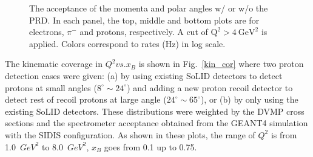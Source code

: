 \begin{figure}[!ht]
 \begin{center}
   \caption[The acceptance of the momenta and scattering angles for electrons, $\pi^{-}$ and protons]{\footnotesize{The acceptance of the momenta and polar angles w/ or w/o the PRD. In each panel, the top, middle and bottom plots are for electrons, $\pi^{-}$ and protons, respectively. A cut of $\mathrm{Q^{2}>4~GeV^{2}}$ is applied. Colors correspond to rates (Hz) in log scale.}}
  \label{p_theta}
  \end{center}
\end{figure}
The kinematic coverage in $Q^{2} vs. x_{B}$ is shown in Fig.~\ref{kin_cor} where two proton detection cases were given: (a) by using  existing SoLID detectors to detect protons at small angles ($8^{\circ}\sim24^{\circ}$) and adding a new proton recoil detector to detect rest of recoil protons at large angle ($24^{\circ}\sim65^{\circ}$), or (b) by only using the existing SoLID detectors. These distributions were weighted by the DVMP cross sections and the spectrometer acceptance obtained from the GEANT4 simulation with the SIDIS configuration. As shown in these plots, the range of $Q^{2}$ is from 1.0~$GeV^{2}$ to 8.0~$GeV^{2}$, $x_{B}$ goes from 0.1 up to 0.75.   

